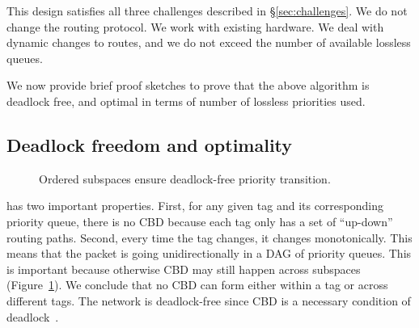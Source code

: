This design satisfies all three challenges described in
\S\ref{sec:challenges}. We do not change the routing protocol. We work with
existing hardware. We deal with dynamic changes to routes, and we do not exceed
the number of available lossless queues.

We now provide brief proof sketches to prove that the above algorithm is
deadlock free, and optimal in terms of number of lossless priorities used. 

\subsection {Deadlock freedom and optimality}

\begin{figure}[t]
	\centering
	
	
	\caption{Ordered subspaces ensure deadlock-free priority transition.}\label{fig:subspace}
\end{figure}

 \sysname{} has two important
properties. First, for any given tag and its corresponding priority queue, there
is no CBD because each tag only has a set of ``up-down'' routing paths.  Second,
every time the tag changes, it changes monotonically. This means that the packet
is going unidirectionally in a DAG of priority queues. This is important because
otherwise CBD may still happen across subspaces (Figure~\ref{fig:subspace}).  We
conclude that no CBD can form either within a tag or across different tags. The
network is deadlock-free since CBD is a necessary condition of
deadlock~\cite{our_hotnets_paper}.


